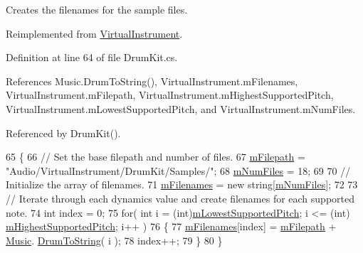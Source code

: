 Creates the filenames for the sample files. 



Reimplemented from \hyperlink{group___v_i_base_virt_func_gaacfc9521214176292bfb9665556fb991}{Virtual\+Instrument}.



Definition at line 64 of file Drum\+Kit.\+cs.



References Music.\+Drum\+To\+String(), Virtual\+Instrument.\+m\+Filenames, Virtual\+Instrument.\+m\+Filepath, Virtual\+Instrument.\+m\+Highest\+Supported\+Pitch, Virtual\+Instrument.\+m\+Lowest\+Supported\+Pitch, and Virtual\+Instrument.\+m\+Num\+Files.



Referenced by Drum\+Kit().


\begin{DoxyCode}
65     \{
66         \textcolor{comment}{// Set the base filepath and number of files.}
67         \hyperlink{group___v_i_base_pro_var_gac428224be859933d720a9c533fdb5643}{mFilepath} = \textcolor{stringliteral}{"Audio/VirtualInstrument/DrumKit/Samples/"};
68         \hyperlink{group___v_i_base_pro_var_ga9a602db8c9833ce75d95dd453c27d341}{mNumFiles} = 18;
69 
70         \textcolor{comment}{// Initialize the array of filenames.}
71         \hyperlink{group___v_i_base_pro_var_gab2add474ca506357688b5dd08cac4cb5}{mFilenames} = \textcolor{keyword}{new} \textcolor{keywordtype}{string}[\hyperlink{group___v_i_base_pro_var_ga9a602db8c9833ce75d95dd453c27d341}{mNumFiles}];
72 
73         \textcolor{comment}{// Iterate through each dynamics value and create filenames for each supported note.}
74         \textcolor{keywordtype}{int} index = 0;
75         \textcolor{keywordflow}{for}( \textcolor{keywordtype}{int} i = (\textcolor{keywordtype}{int})\hyperlink{group___v_i_base_pro_var_ga3cae52b1bcc0178a8a6b03c7aaf7aac8}{mLowestSupportedPitch}; i <= (int)
      \hyperlink{group___v_i_base_pro_var_ga61fb2c33b53a0f663047779d7ceb18f3}{mHighestSupportedPitch}; i++ )
76         \{
77             \hyperlink{group___v_i_base_pro_var_gab2add474ca506357688b5dd08cac4cb5}{mFilenames}[index] = \hyperlink{group___v_i_base_pro_var_gac428224be859933d720a9c533fdb5643}{mFilepath} + \hyperlink{class_music}{Music}.
      \hyperlink{group___music_stat_func_gaf5f64ebe9a7e036e07f283e41f26d22b}{DrumToString}( i );
78             index++;
79         \}
80     \}
\end{DoxyCode}
\mbox{\label{class_drum_kit_ad14c6155e6ec62f26a30261e273d6379}} 
